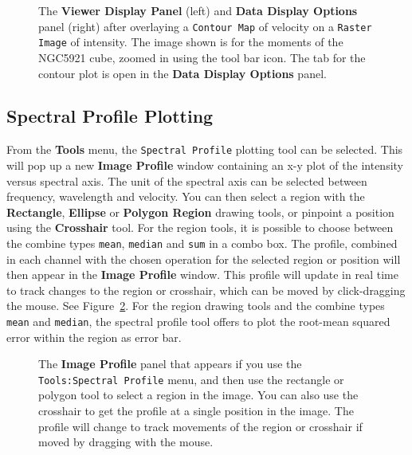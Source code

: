 \begin{figure}[h!]
\begin{center}
\caption{\label{fig:viewer_rascon} The {\bf Viewer Display Panel}
(left) and {\bf Data Display Options} panel (right) after overlaying
a {\tt Contour Map} of velocity on a {\tt Raster Image} of intensity.  The
image shown is for the moments of the NGC5921 cube, zoomed in using the tool bar icon.
The tab for the contour plot is open in the {\bf Data Display Options} 
panel.} 
\hrulefill
\end{center}
\end{figure}

\subsection{Spectral Profile Plotting}
\label{section:display.image.specprof}

From the {\bf Tools} menu, the {\tt Spectral Profile} plotting
tool can be selected.  This will pop up a new {\bf Image Profile}
window containing an x-y plot of the intensity versus spectral
axis. The unit of the spectral axis can be selected between frequency,
wavelength and velocity. You can then select a region with the
{\bf Rectangle}, {\bf Ellipse} or {\bf Polygon Region} drawing tools,
or pinpoint a position using the {\bf Crosshair} tool. For the region
tools, it is possible to choose between the combine types
{\tt mean}, {\tt median} and {\tt sum} in a combo box.
The profile, combined in each channel with the chosen operation
for the selected region or position will then appear in the
{\bf Image Profile} window.  This profile will update in real time
to track changes to the region or crosshair, which can be moved
by click-dragging the mouse. See Figure~\ref{fig:viewer_specprof}.
For the region drawing tools and the combine types {\tt mean} and
{\tt median}, the spectral profile tool offers to plot the
root-mean squared error within the region as error bar.


\begin{figure}[h!]
\begin{center}
\caption{\label{fig:viewer_specprof} The {\bf Image Profile} panel
that appears if you use the {\tt Tools:Spectral Profile} menu,
and then use the rectangle or polygon tool to select a region in the image.
You can also use the crosshair to get the profile at a single
position in the image.  The profile will change to track movements
of the region or crosshair if moved by dragging with the mouse.} 
\hrulefill
\end{center}
\end{figure}

